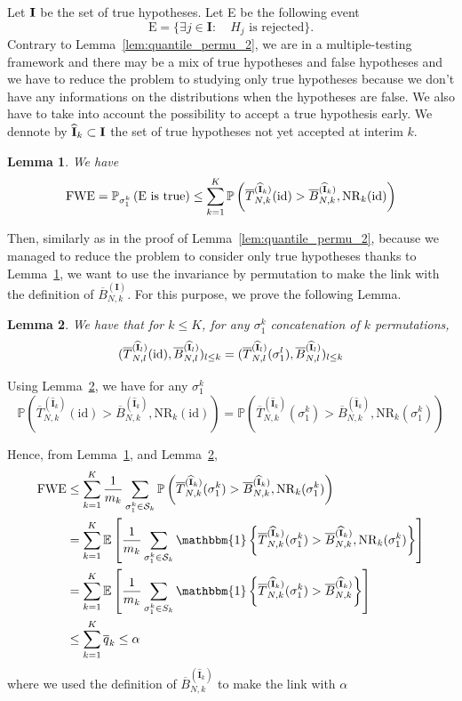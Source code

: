 \documentclass{article}
\theoremstyle{plain}
\newtheorem{Lemma}{Lemma}
\theoremstyle{remark}
\renewcommand{\P}{\mathbb{P}}
\newcommand{\E}{\mathbb{E}}
\newcommand{\1}{\mathbbm{1}}
\newcommand{\id}{\mathrm{id}}
\newcommand{\I}{\bf I}
\numberwithin{equation}{section}
\begin{document}
Let $\I$ be the set of true hypotheses. Let E be the following event
$$\mathrm{E}= \{ \exists j \in \textbf{I}: \quad H_j \text{ is rejected}\}.$$
Contrary to Lemma~\ref{lem:quantile_permu_2}, we are in a multiple-testing framework and there may be a mix of true hypotheses and false hypotheses and we have to reduce the problem to studying only true hypotheses because we don't have any informations on the distributions when the hypotheses are false. We also have to take into account the possibility to accept a true hypothesis early. We dennote by $\widehat{\I}_k \subset \I$ the set of true hypotheses not yet accepted at interim $k$.
\begin{Lemma}\label{lem:multiple_test_FWE}
We have 
$$\mathrm{FWE} = \P_{\sigma_1^k}\left(\mathrm{E}\text{ is true} \right) \le \sum_{k=1}^K\P\left( \overline{T}_{N,k}^{(\widehat{\I}_k)}(\id) > \overline{B}_{N,k}^{(\widehat{\textbf{I}}_k)}, \mathrm{NR}_k(\id)\right)  $$
\end{Lemma}
Then, similarly as in the proof of Lemma~\ref{lem:quantile_permu_2}, because we managed to reduce the problem to consider only true hypotheses thanks to Lemma~\ref{lem:multiple_test_FWE}, we want to use the invariance by permutation to make the link with the definition of $\overline{B}_{N,k}^{(\textbf{I})}$. For this purpose, we prove the following Lemma.


\begin{Lemma}\label{lem:invariance}
We have that for $k \le K$, for any ${\sigma_1^k}$ concatenation of $k$ permutations, 
$$(\overline{T}_{N,l}^{(\widehat{\bf{I}}_l)}(\id),\overline{B}_{N,l}^{(\widehat{\bf{I}}_l)})_{l\le k}=(\overline{T}_{N,l}^{(\widehat{\bf{I}}_l)}(\sigma_1^l), \overline{B}_{N,l}^{(\widehat{\bf{I}}_l)})_{l\le k}$$
\end{Lemma}
Using Lemma~\ref{lem:invariance}, we have for any ${\sigma_1^k}$
$$\P\left(\overline{T}_{N,k}^{(\widehat{\textbf{I}}_k)}(\id) > \overline{B}_{N,k}^{(\widehat{\textbf{I}}_k)}, \mathrm{NR}_k(\id ) \right) = \P\left(\overline{T}_{N,k}^{(\widehat{\textbf{I}}_k)}({\sigma_1^k}) > \overline{B}_{N,k}^{(\widehat{\textbf{I}}_k)}, \mathrm{NR}_k({\sigma_1^k}) \right)$$

Hence, from Lemma~\ref{lem:multiple_test_FWE}, and Lemma~\ref{lem:invariance},
\begin{align*}
\mathrm{FWE} &\le \sum_{k=1}^K\frac{1}{m_k}\sum_{\sigma_1^k \in \mathcal{S}_k} \P\left(\overline{T}_{N,k}^{(\widehat{\textbf{I}}_k)}(\sigma_1^k) > \overline{B}_{N,k}^{(\widehat{\textbf{I}}_k)}, \mathrm{NR}_k(\sigma_1^k) \right)\\
&= \sum_{k=1}^K\E\left[\frac{1}{m_k}\sum_{\sigma_1^k \in \mathcal{S}_k} \1\left\{\overline{T}_{N,k}^{(\widehat{\textbf{I}}_k)}(\sigma_1^k) > \overline{B}_{N,k}^{(\widehat{\textbf{I}}_k)}, \mathrm{NR}_k(\sigma_1^k)\right\} \right]\\
&= \sum_{k=1}^K \E\left[\frac{1}{m_k}\sum_{{\sigma_1^k} \in S_k}\1\left\{ \overline{T}_{N,k}^{(\widehat{\textbf{I}}_k)}({\sigma_1^k}) > \overline{B}_{N,k}^{(\widehat{\textbf{I}}_k)}\right\} \right]\\
&\le \sum_{k=1}^K \overline{q}_k \le \alpha
\end{align*}
where we used the definition of $\overline{B}_{N,k}^{(\widehat{\textbf{I}}_k)}$ to make the link with $\alpha$
\end{document}
